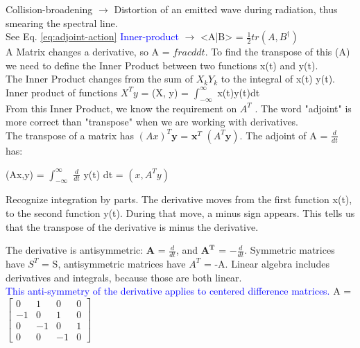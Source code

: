 \documentclass[a4paper, 10pt, onepage]{elegantbook}
\begin{document}
{Collision-broadening $\longrightarrow$ Distortion of an emitted wave during radiation, thus smearing the spectral line. \\
 
See Eq. \eqref{eq:adjoint-action} \quad \textcolor{blue}{Inner-product} $\longrightarrow$ <A|B> = $\frac{1}{2}tr(A,B^\dagger)$ \\

A Matrix changes  a derivative, so A = $frac{d}{dt}$. To find the transpose of this (A) we need to define
the Inner Product between two functions x(t) and y(t). \\

The Inner Product changes from the sum of $X_k Y_k$ to the integral of x(t) y(t). \\

Inner product of functions $X^{T}y$ = (X, y) = $\int_{- \infty}^\infty$ x(t)y(t)dt  \\

From this Inner Product, we know the requirement on $A^T$ . The word "adjoint" is more
correct than "transpose" when we are working with derivatives.  \\

The transpose of a matrix has $(Ax)^{T} \mathbf y$ = $\mathbf{x}^T$ $(A^T \mathbf y)$. The adjoint of A = $\frac{d}{dt}$ has:

(Ax,y) = $\int_{- \infty}^\infty$ $\frac{d}{dt}$ y(t) dt = $(x, A^{T}y)$

Recognize integration by parts. The derivative moves from the first
function x(t), to the second function y(t). During that move, a minus sign appears.
This tells us that the transpose of the derivative is minus the derivative.

The derivative is antisymmetric: $\mathbf{A}$ = $\frac{d}{dt}$, and $\mathbf{A^T}$ = ${- \frac{d}{dt}}$. Symmetric matrices have $S^T$ = S, antisymmetric matrices have $A^T$ = -A. Linear algebra includes derivatives and integrals, because those are both linear.  \\

\textcolor{blue}{This anti-symmetry of the derivative applies to centered difference matrices.} A =  \\

$
\begin{bmatrix}
0 & 1 & 0 & 0 \\
-1 & 0 & 1 & 0 \\
0 & -1 & 0 & 1 \\
0 & 0 & -1 & 0
\end{bmatrix}
$
\noindent

}
\end{document}
